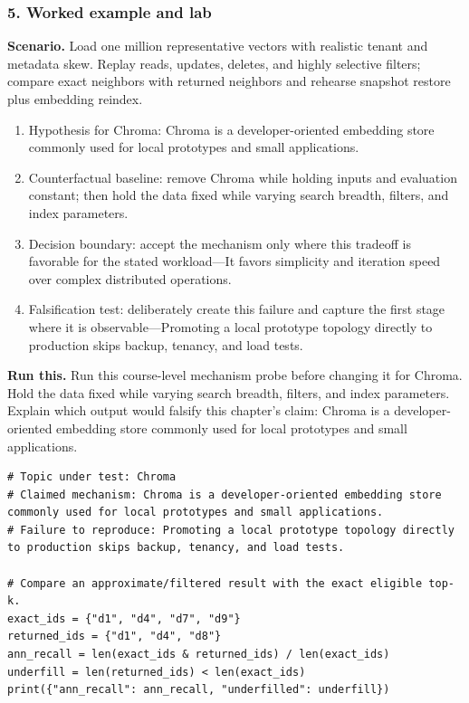 \subsubsection*{5. Worked example and lab}
\textbf{Scenario.} Load one million representative vectors with realistic tenant and metadata skew. Replay reads, updates, deletes, and highly selective filters; compare exact neighbors with returned neighbors and rehearse snapshot restore plus embedding reindex.
\begin{enumerate}
\item Hypothesis for Chroma: Chroma is a developer-oriented embedding store commonly used for local prototypes and small applications.
\item Counterfactual baseline: remove Chroma while holding inputs and evaluation constant; then hold the data fixed while varying search breadth, filters, and index parameters.
\item Decision boundary: accept the mechanism only where this tradeoff is favorable for the stated workload—It favors simplicity and iteration speed over complex distributed operations.
\item Falsification test: deliberately create this failure and capture the first stage where it is observable—Promoting a local prototype topology directly to production skips backup, tenancy, and load tests.
\end{enumerate}
\textbf{Run this.} Run this course-level mechanism probe before changing it for Chroma. Hold the data fixed while varying search breadth, filters, and index parameters. Explain which output would falsify this chapter's claim: Chroma is a developer-oriented embedding store commonly used for local prototypes and small applications.
\begin{Verbatim}[fontsize=\scriptsize]
# Topic under test: Chroma
# Claimed mechanism: Chroma is a developer-oriented embedding store commonly used for local prototypes and small applications.
# Failure to reproduce: Promoting a local prototype topology directly to production skips backup, tenancy, and load tests.

# Compare an approximate/filtered result with the exact eligible top-k.
exact_ids = {"d1", "d4", "d7", "d9"}
returned_ids = {"d1", "d4", "d8"}
ann_recall = len(exact_ids & returned_ids) / len(exact_ids)
underfill = len(returned_ids) < len(exact_ids)
print({"ann_recall": ann_recall, "underfilled": underfill})
\end{Verbatim}
